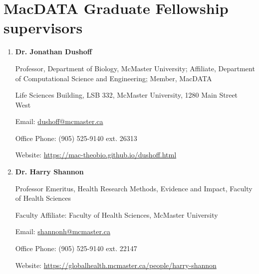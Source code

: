 \section{MacDATA Graduate Fellowship supervisors}

\begin{enumerate}

\item \textbf{Dr. Jonathan Dushoff}

Professor, Department of Biology, McMaster University; Affiliate,  Department of Computational Science and Engineering; Member, MacDATA

Life Sciences Building, LSB 332, McMaster University, 1280 Main Street West

Email: \url{dushoff@mcmaster.ca}

Office Phone: (905) 525-9140 ext. 26313

Website: \url{https://mac-theobio.github.io/dushoff.html}

\item \textbf{Dr. Harry Shannon}

Professor Emeritus, Health Research Methods, Evidence and Impact, Faculty of Health Sciences

Faculty Affiliate: Faculty of Health Sciences, McMaster University

Email: \url{shannonh@mcmaster.ca}

Office Phone: (905) 525-9140 ext. 22147

Website: \url{https://globalhealth.mcmaster.ca/people/harry-shannon}

\end{enumerate}

